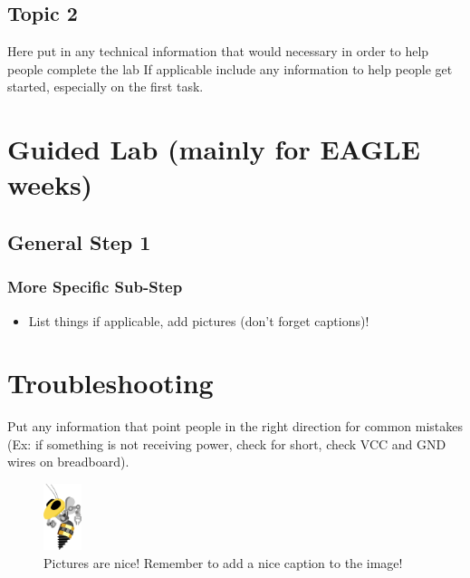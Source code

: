 \documentclass{article}
\begin{document}
\subsection{Topic 2}
Here put in any technical information that would necessary in order to help people complete the lab
If applicable include any information to help people get started, especially on the first task.

\section{Guided Lab (mainly for EAGLE weeks)}
\subsection{General Step 1}
\subsubsection{More Specific Sub-Step}
\begin{itemize}
    \item List things if applicable, add pictures (don't forget captions)!
\end{itemize}

\section{Troubleshooting}
Put any information that point people in the right direction for common mistakes (Ex: if something is not receiving power, check for short, check VCC and GND wires on breadboard).

\begin{figure}[ht]
	\center
	\includegraphics[width=0.1\textwidth, keepaspectratio]{images/robobuzz.png}
	\caption{Pictures are nice! Remember to add a nice caption to the image!}
	\label{fig:robobuzz}
\end{figure}
\end{document}
